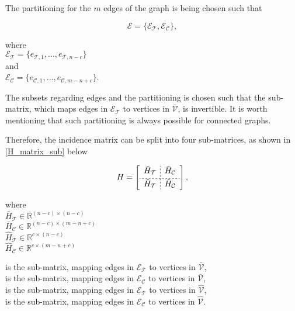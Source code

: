 The partitioning for the $m$ edges of the graph is being chosen such that

\begin{equation}
  \label{edges1}
  \mathcal{E} = \{\mathcal{E_{\mathcal{T}}}, \mathcal{E_{\mathcal{C}}} \},
\end{equation}

\begin{minipage}[t]{0.35\textwidth}
where\\
\hspace*{8mm} $\mathcal{E_{\mathcal{T}}} = \{e_{\mathcal{T},1}, ..., e_{\mathcal{T},n-c}\}$\\
and\\
\hspace*{8mm} $\mathcal{E_{\mathcal{C}}} = \{e_{\mathcal{C},1}, ..., e_{\mathcal{C},m-n+c}\}$. 
\end{minipage}

The subsets regarding edges and the partitioning is chosen such that the sub-matrix, which maps edges in $\mathcal{E_{\mathcal{T}}}$ to vertices in $\bar{\mathcal{V}}$, is invertible. It is worth mentioning that such partitioning is always possible for connected graphs. 

Therefore, the incidence matrix can be split into four sub-matrices, as shown in \eqref{H_matrix_sub} below

\begin{equation}
\label{H_matrix_sub}
H=
\left[
\begin{array}{c;{2pt/2pt}r}
\bar{H}_{\mathcal{T}} & \bar{H}_{\mathcal{C}} \\[3pt]
\hdashline[2pt/2pt] 
\hat{H}_{\mathcal{T}} & \hat{H}_{\mathcal{C}}
\end{array}
\right],
\end{equation}

\begin{minipage}[t]{0.3\textwidth}
where\\
\hspace*{8mm} $\bar{H}_{\mathcal{T}} \in \mathbb{R}^{(n-c) \times (n-c)}$\\ 
\hspace*{8mm} $\bar{H}_{\mathcal{C}} \in \mathbb{R}^{(n-c) \times (m\!-\!n\!+\!c)}$\\
\hspace*{8mm} $\hat{H}_{\mathcal{T}} \in \mathbb{R}^{c \times (n-c)}$\\
\hspace*{8mm} $\hat{H}_{\mathcal{C}} \in \mathbb{R}^{c \times (m-n+c)}$
\end{minipage}
\begin{minipage}[t]{0.68\textwidth}
\vspace*{-0.1mm}
is the sub-matrix, mapping edges in $\mathcal{E_{\mathcal{T}}}$ to vertices in $\bar{\mathcal{V}}$,\\ 
is the sub-matrix, mapping edges in $\mathcal{E_{\mathcal{C}}}$ to vertices in $\bar{\mathcal{V}}$,\\
is the sub-matrix, mapping edges in $\mathcal{E_{\mathcal{T}}}$ to vertices in $\hat{\mathcal{V}}$,\\
is the sub-matrix, mapping edges in $\mathcal{E_{\mathcal{C}}}$ to vertices in $\hat{\mathcal{V}}$. 
\end{minipage}

